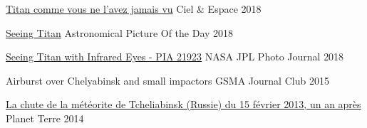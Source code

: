 
\begin{cvhonors}

	\cvhonor
	{\href{https://www.cieletespace.fr/actualites/titan-comme-vous-ne-l-avez-jamais-vu}{Titan comme vous ne l'avez jamais vu}}
	{}
	{Ciel \& Espace}
	{2018}

    \cvhonor
	{\href{https://apod.nasa.gov/apod/ap180818.html}{Seeing Titan}}
	{}
	{Astronomical Picture Of the Day}
	{2018}

	\cvhonor
	{\href{https://www.jpl.nasa.gov/spaceimages/details.php?id=PIA21923}{Seeing Titan with Infrared Eyes - PIA 21923}}
	{}
	{NASA JPL Photo Journal}
	{2018}

    \cvhonor
	{Airburst over Chelyabinsk and small impactors}
	{}
	{GSMA Journal Club}
	{2015}

	\cvhonor
	{\href{{http://planet-terre.ens-lyon.fr/article/meteorite-Tcheliabinsk.xml}}{La chute de la météorite de Tcheliabinsk (Russie) du 15 février 2013, un an après}}
	{}
	{Planet Terre}
	{2014}

\end{cvhonors}
